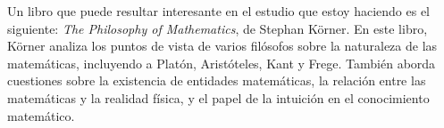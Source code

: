 \documentclass[12pt]{report}
\newcounter{it}
\theoremstyle{largebreak}
\begin{document}
    \begin{obs}
        Un libro que puede resultar interesante en el estudio que estoy haciendo es el siguiente: \textit{The Philosophy of Mathematics}, de Stephan Körner. En este libro, Körner analiza los puntos de vista de varios filósofos sobre la naturaleza de las matemáticas, incluyendo a Platón, Aristóteles, Kant y Frege. También aborda cuestiones sobre la existencia de entidades matemáticas, la relación entre las matemáticas y la realidad física, y el papel de la intuición en el conocimiento matemático.
    \end{obs}
\end{document}
